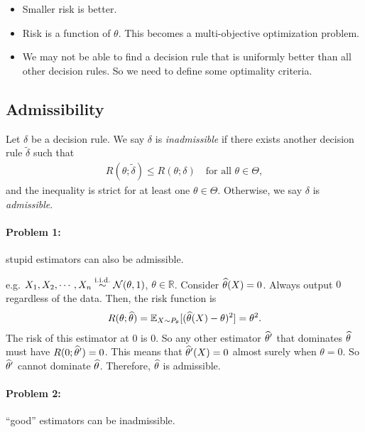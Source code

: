 \documentclass[11pt,letterpaper]{article}
\begin{document}
\begin{itemize}
  \item Smaller risk is better.
  \item Risk is a function of $\theta$. This becomes a multi-objective optimization problem.
  \item We may not be able to find a decision rule that is uniformly better than all other decision rules. So we need to define some optimality criteria.
\end{itemize}

\subsection{Admissibility}
\begin{definition}
  Let $\delta$ be a decision rule. We say $\delta$ is \emph{inadmissible} if there exists another decision rule $\widetilde{\delta}$ such that
  \begin{align*}
    R(\theta; \widetilde{\delta}) \leq R(\theta; \delta) \quad \text{for all } \theta \in \Theta,
  \end{align*}
  and the inequality is strict for at least one $\theta \in \Theta$. Otherwise, we say $\delta$ is \emph{admissible}.
\end{definition}

\paragraph{Problem 1:} stupid estimators can also be admissible.

e.g. $X_1, X_2, \cdots, X_n \overset{\mathrm{i.i.d.}}{\sim} \mathcal{N} (\theta, 1)$, $\theta \in \mathbb{R}$. Consider $\widehat{\theta} (X) = 0$. Always output $0$ regardless of the data. Then, the risk function is
\begin{align*}
  R (\theta; \widehat{\theta}) = {\mathbb{E}}_{X \sim P_\theta} [(\widehat{\theta}(X) - \theta)^2] = \theta^2.
\end{align*}
The risk of this estimator at $0$ is $0$. So any other estimator ${\widehat{\theta}}'$ that dominates $\widehat{\theta}$ must have $R(0; {\widehat{\theta}}') = 0$. This means that ${\widehat{\theta}}'(X) = 0$ almost surely when $\theta = 0$. So ${\widehat{\theta}}'$ cannot dominate $\widehat{\theta}$. Therefore, $\widehat{\theta}$ is admissible.

\paragraph{Problem 2:} ``good'' estimators can be inadmissible.
\end{document}

